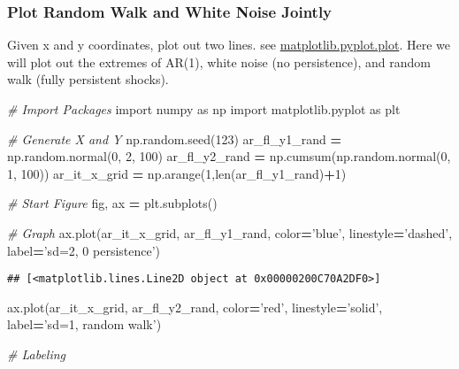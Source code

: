 \documentclass[
]{book}
\newenvironment{Shaded}{\begin{snugshade}}{\end{snugshade}}
\newcommand{\BuiltInTok}[1]{#1}
\newcommand{\CommentTok}[1]{\textcolor[rgb]{0.56,0.35,0.01}{\textit{#1}}}
\newcommand{\DecValTok}[1]{\textcolor[rgb]{0.00,0.00,0.81}{#1}}
\newcommand{\ImportTok}[1]{#1}
\newcommand{\NormalTok}[1]{#1}
\newcommand{\OperatorTok}[1]{\textcolor[rgb]{0.81,0.36,0.00}{\textbf{#1}}}
\newcommand{\StringTok}[1]{\textcolor[rgb]{0.31,0.60,0.02}{#1}}
\begin{document}
\hypertarget{plot-random-walk-and-white-noise-jointly}{%
\subsubsection{Plot Random Walk and White Noise Jointly}\label{plot-random-walk-and-white-noise-jointly}}

Given x and y coordinates, plot out two lines. see \href{https://matplotlib.org/2.1.1/api/_as_gen/matplotlib.pyplot.plot.html}{matplotlib.pyplot.plot}. Here we will plot out the extremes of AR(1), white noise (no persistence), and random walk (fully persistent shocks).

\begin{Shaded}
\begin{Highlighting}[]
\CommentTok{# Import Packages}
\ImportTok{import}\NormalTok{ numpy }\ImportTok{as}\NormalTok{ np}
\ImportTok{import}\NormalTok{ matplotlib.pyplot }\ImportTok{as}\NormalTok{ plt}

\CommentTok{# Generate X and Y}
\NormalTok{np.random.seed(}\DecValTok{123}\NormalTok{)}
\NormalTok{ar_fl_y1_rand }\OperatorTok{=}\NormalTok{ np.random.normal(}\DecValTok{0}\NormalTok{, }\DecValTok{2}\NormalTok{, }\DecValTok{100}\NormalTok{)}
\NormalTok{ar_fl_y2_rand }\OperatorTok{=}\NormalTok{ np.cumsum(np.random.normal(}\DecValTok{0}\NormalTok{, }\DecValTok{1}\NormalTok{, }\DecValTok{100}\NormalTok{))}
\NormalTok{ar_it_x_grid }\OperatorTok{=}\NormalTok{ np.arange(}\DecValTok{1}\NormalTok{,}\BuiltInTok{len}\NormalTok{(ar_fl_y1_rand)}\OperatorTok{+}\DecValTok{1}\NormalTok{)}

\CommentTok{# Start Figure}
\NormalTok{fig, ax }\OperatorTok{=}\NormalTok{ plt.subplots()}

\CommentTok{# Graph}
\NormalTok{ax.plot(ar_it_x_grid, ar_fl_y1_rand,}
\NormalTok{                     color}\OperatorTok{=}\StringTok{'blue'}\NormalTok{, linestyle}\OperatorTok{=}\StringTok{'dashed'}\NormalTok{,}
\NormalTok{                     label}\OperatorTok{=}\StringTok{'sd=2, 0 persistence'}\NormalTok{)}
\end{Highlighting}
\end{Shaded}

\begin{verbatim}
## [<matplotlib.lines.Line2D object at 0x00000200C70A2DF0>]
\end{verbatim}

\begin{Shaded}
\begin{Highlighting}[]
\NormalTok{ax.plot(ar_it_x_grid, ar_fl_y2_rand,}
\NormalTok{                     color}\OperatorTok{=}\StringTok{'red'}\NormalTok{, linestyle}\OperatorTok{=}\StringTok{'solid'}\NormalTok{,}
\NormalTok{                     label}\OperatorTok{=}\StringTok{'sd=1, random walk'}\NormalTok{)}
                     
\CommentTok{# Labeling}
\end{Highlighting}
\end{Shaded}
\end{document}
